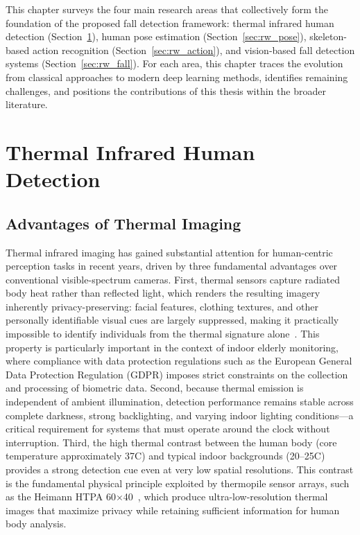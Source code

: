 
\label{sec:related_work}

This chapter surveys the four main research areas that collectively form the foundation of the proposed fall detection framework: thermal infrared human detection (Section~\ref{sec:rw_thermal}), human pose estimation (Section~\ref{sec:rw_pose}), skeleton-based action recognition (Section~\ref{sec:rw_action}), and vision-based fall detection systems (Section~\ref{sec:rw_fall}). For each area, this chapter traces the evolution from classical approaches to modern deep learning methods, identifies remaining challenges, and positions the contributions of this thesis within the broader literature.

\section{Thermal Infrared Human Detection}
\label{sec:rw_thermal}

\subsection*{Advantages of Thermal Imaging}

Thermal infrared imaging has gained substantial attention for human-centric perception tasks in recent years, driven by three fundamental advantages over conventional visible-spectrum cameras. First, thermal sensors capture radiated body heat rather than reflected light, which renders the resulting imagery inherently privacy-preserving: facial features, clothing textures, and other personally identifiable visual cues are largely suppressed, making it practically impossible to identify individuals from the thermal signature alone~\cite{gade2014thermal}. This property is particularly important in the context of indoor elderly monitoring, where compliance with data protection regulations such as the European General Data Protection Regulation (GDPR) imposes strict constraints on the collection and processing of biometric data. Second, because thermal emission is independent of ambient illumination, detection performance remains stable across complete darkness, strong backlighting, and varying indoor lighting conditions---a critical requirement for systems that must operate around the clock without interruption. Third, the high thermal contrast between the human body (core temperature approximately 37\textdegree{}C) and typical indoor backgrounds (20--25\textdegree{}C) provides a strong detection cue even at very low spatial resolutions. This contrast is the fundamental physical principle exploited by thermopile sensor arrays, such as the Heimann HTPA 60$\times$40~\cite{heimann2024htpa}, which produce ultra-low-resolution thermal images that maximize privacy while retaining sufficient information for human body analysis.

